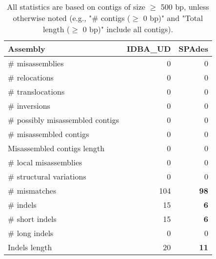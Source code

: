\documentclass[12pt,a4paper]{article}
\begin{document}
\begin{table}[ht]
\begin{center}
\caption{All statistics are based on contigs of size $\geq$ 500 bp, unless otherwise noted (e.g., "\# contigs ($\geq$ 0 bp)" and "Total length ($\geq$ 0 bp)" include all contigs).}
\begin{tabular}{|l*{2}{|r}|}
\hline
Assembly & IDBA\_UD & SPAdes \\ \hline
\# misassemblies & 0 & 0 \\ \hline
\hspace{5mm}\# relocations & 0 & 0 \\ \hline
\hspace{5mm}\# translocations & 0 & 0 \\ \hline
\hspace{5mm}\# inversions & 0 & 0 \\ \hline
\# possibly misassembled contigs & 0 & 0 \\ \hline
\# misassembled contigs & 0 & 0 \\ \hline
Misassembled contigs length & 0 & 0 \\ \hline
\# local misassemblies & 0 & 0 \\ \hline
\# structural variations & 0 & 0 \\ \hline
\# mismatches & 104 & {\bf 98} \\ \hline
\# indels & 15 & {\bf 6} \\ \hline
\hspace{5mm}\# short indels & 15 & {\bf 6} \\ \hline
\hspace{5mm}\# long indels & 0 & 0 \\ \hline
Indels length & 20 & {\bf 11} \\ \hline
\end{tabular}
\end{center}
\end{table}
\end{document}

